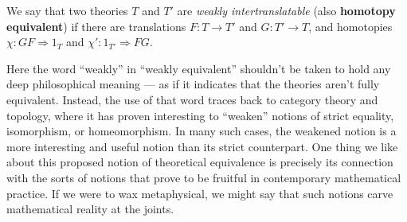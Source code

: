 
\begin{defn} We say that two theories $T$ and $T'$ are \emph{weakly
    intertranslatable} (also \textbf{homotopy equivalent}) if there
  are translations $F:T\to T'$ and $G:T'\to T$, and homotopies
  $\chi :GF\Rightarrow 1_T$ and $\chi ':1_{T'}\Rightarrow
  FG$. \label{def:weak} \end{defn}

\begin{note} Here the word ``weakly'' in ``weakly equivalent''
  shouldn't be taken to hold any deep philosophical meaning --- as if
  it indicates that the theories aren't fully equivalent.  Instead,
  the use of that word traces back to category theory and topology,
  where it has proven interesting to ``weaken'' notions of strict
  equality, isomorphism, or homeomorphism.  In many such cases, the
  weakened notion is a more interesting and useful notion than its
  strict counterpart.  One thing we like about this proposed notion of
  theoretical equivalence is precisely its connection with the sorts
  of notions that prove to be fruitful in contemporary mathematical
  practice.  If we were to wax metaphysical, we might say that such
  notions carve mathematical reality at the joints.  \end{note}



